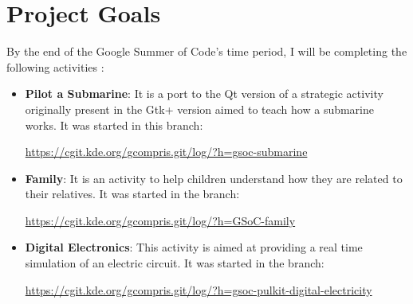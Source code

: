 \documentclass[preprint,12pt]{elsarticle}
\begin{document}



\section{Project Goals}
\label{S:1}

By the end of the Google Summer of Code's time period, I will be completing the following activities :

\begin{itemize}

\item \textbf{Pilot a Submarine}: It is a port to the Qt version of a strategic activity originally present in the Gtk+ version aimed to teach how a submarine works. It was started in this branch: 

\href{https://cgit.kde.org/gcompris.git/log/?h=gsoc-submarine}{https://cgit.kde.org/gcompris.git/log/?h=gsoc-submarine}

\item \textbf{Family}: It is an activity to help children understand how they are related to their relatives. It was started in the branch:

\href{https://cgit.kde.org/gcompris.git/log/?h=GSoC-family}{https://cgit.kde.org/gcompris.git/log/?h=GSoC-family}

\item \textbf{Digital Electronics}: This activity is aimed at providing a real time simulation of an electric circuit. It was started in the branch:

\href{https://cgit.kde.org/gcompris.git/log/?h=gsoc_pulkit_digital_electricity}{https://cgit.kde.org/gcompris.git/log/?h=gsoc-pulkit-digital-electricity}

\end{itemize}
\end{document}
